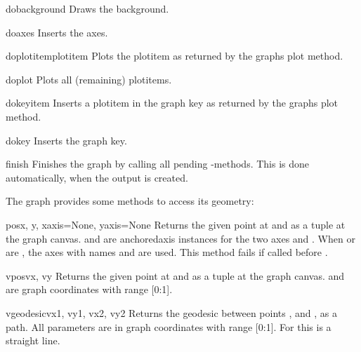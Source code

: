 \begin{methoddesc}{dobackground}{}
  Draws the background.
\end{methoddesc}

\begin{methoddesc}{doaxes}{}
  Inserts the axes.
\end{methoddesc}

\begin{methoddesc}{doplotitem}{plotitem}
  Plots the plotitem as returned by the graphs plot method.
\end{methoddesc}

\begin{methoddesc}{doplot}{}
  Plots all (remaining) plotitems.
\end{methoddesc}

\begin{methoddesc}{dokeyitem}{}
  Inserts a plotitem in the graph key as returned by the graphs plot method.
\end{methoddesc}

\begin{methoddesc}{dokey}{}
  Inserts the graph key.
\end{methoddesc}

\begin{methoddesc}{finish}{}
  Finishes the graph by calling all pending -methods. This
  is done automatically, when the output is created.
\end{methoddesc}

The graph provides some methods to access its geometry:

\begin{methoddesc}{pos}{x, y, xaxis=None, yaxis=None}
  Returns the given point at  and  as a tuple
   at the graph canvas.  and  are
  anchoredaxis instances for the two axes  and .
  When  or  are , the axes with names
   and  are used. This method fails if called before
  .
\end{methoddesc}

\begin{methoddesc}{vpos}{vx, vy}
  Returns the given point at  and  as a tuple
   at the graph canvas.  and  are
  graph coordinates with range [0:1].
\end{methoddesc}

\begin{methoddesc}{vgeodesic}{vx1, vy1, vx2, vy2}
  Returns the geodesic between points ,  and
  ,  as a path. All parameters are in graph
  coordinates with range [0:1]. For  this is a straight
  line.
\end{methoddesc}

